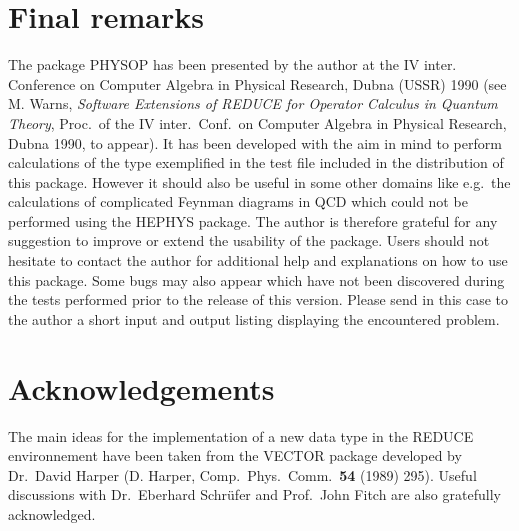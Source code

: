 \section{Final remarks}
The package PHYSOP has been presented by
the author at the IV inter. Conference on Computer Algebra in Physical
Research, Dubna (USSR) 1990 (see M. Warns, {\it
Software Extensions of REDUCE for Operator Calculus in Quantum Theory},
Proc.\ of the IV inter.\ Conf.\ on Computer Algebra in Physical
Research, Dubna 1990, to appear). It has been developed with the aim in
mind to perform calculations of the type exemplified in the test file
included in the distribution of this package.
However it should
also be useful in some other domains like e.g.\ the calculations of
complicated Feynman diagrams in QCD  which could not be  performed using
the HEPHYS package. The author is  therefore grateful for any
suggestion
to improve or extend the usability of the package. Users should not
hesitate to contact the author for additional help and explanations on
how to use
this package. Some bugs may also
appear which have not been discovered during the tests performed
prior to the release of this version. Please send in this case to the
author  a short
input and output listing  displaying the encountered problem.

\section*{Acknowledgements}
The main ideas for the implementation of a new data type in the REDUCE
environnement have been taken from the VECTOR package developed by
Dr.\ David Harper (D. Harper, Comp.\ Phys.\ Comm.\ {\bf 54} (1989)
295).
Useful discussions with  Dr.\ Eberhard Schr\"ufer  and
Prof.\ John Fitch are also gratefully acknowledged.

\appendix

